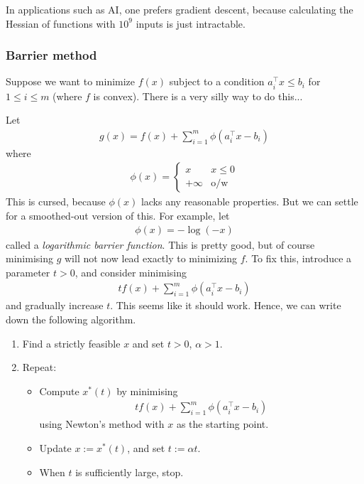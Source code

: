 \documentclass{../template/note}
\begin{document}
    \begin{remark*}
        In applications such as AI, one prefers gradient descent, because calculating the Hessian of functions with $10^9$ inputs is just intractable.
    \end{remark*}
    
    \subsubsection{Barrier method}

    Suppose we want to minimize $f(x)$ subject to a condition $a_i^\intercal x \leq b_i$ for $1 \leq i \leq m$ (where $f$ is convex). There is a very silly way to do this...

    Let
    \begin{align*}
        g(x) = f(x) + \sum_{i=1}^m \phi(a_i^\intercal x - b_i)
    \end{align*}
    where
    \begin{align*}
        \phi(x) = \begin{cases}
            x & x \leq 0 \\
            +\infty & \text{o/w}
        \end{cases}
    \end{align*}
    This is cursed, because $\phi(x)$ lacks any reasonable properties. But we can settle for a smoothed-out version of this. For example, let
    \begin{align*}
        \phi(x) = -\log(-x)
    \end{align*}
    called a \emph{logarithmic barrier function}. This is pretty good, but of course minimising $g$ will not now lead exactly to minimizing $f$. To fix this, introduce a parameter $t >0$, and consider minimising
    \begin{align*}
        tf(x) + \sum_{i=1}^m \phi(a_i^\intercal x - b_i)
    \end{align*}
    and gradually increase $t$. This seems like it should work. Hence, we can write down the following algorithm.

    \begin{algorithm}
        \begin{enumerate}[label=\protect\circled{\arabic*}]
            \item Find a strictly feasible $x$ and set $t > 0$, $\alpha > 1$.
            \item Repeat:
            \begin{itemize}
                \item Compute $x^*(t)$ by minimising
                \begin{align*}
                    tf(x) + \sum_{i=1}^m \phi(a_i^\intercal x - b_i)
                \end{align*}
                using Newton's method with $x$ as the starting point.
                \item Update $x := x^*(t)$, and set $t := \alpha t$.
                \item When $t$ is sufficiently large, stop.
            \end{itemize}
        \end{enumerate}
    \end{algorithm}
\end{document}
